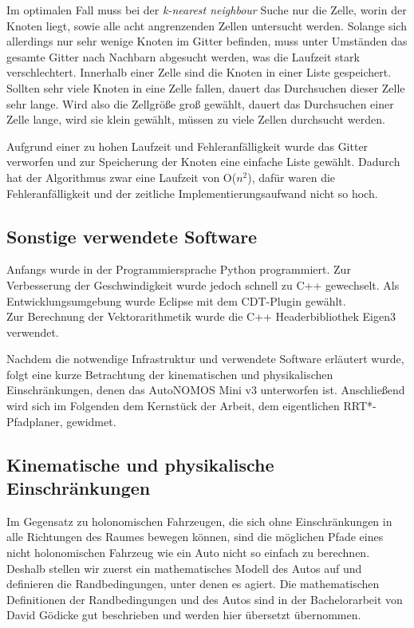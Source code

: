 Im optimalen Fall muss bei der \textit{k-nearest neighbour} Suche nur die Zelle, worin der Knoten liegt, sowie alle acht angrenzenden Zellen untersucht werden. Solange sich allerdings nur sehr wenige Knoten im Gitter befinden, muss unter Umständen das gesamte Gitter nach Nachbarn abgesucht werden, was die Laufzeit stark verschlechtert. Innerhalb einer Zelle sind die Knoten in einer Liste gespeichert. Sollten sehr viele Knoten in eine Zelle fallen, dauert das Durchsuchen dieser Zelle sehr lange. Wird also die Zellgröße groß gewählt, dauert das Durchsuchen einer Zelle lange, wird sie klein gewählt, müssen zu viele Zellen durchsucht werden. 

Aufgrund einer zu hohen Laufzeit und Fehleranfälligkeit wurde das Gitter verworfen und zur Speicherung der Knoten eine einfache Liste gewählt. Dadurch hat der Algorithmus zwar eine Laufzeit von O($n^2$), dafür waren die Fehleranfälligkeit und der zeitliche Implementierungsaufwand nicht so hoch. \\
\subsection{Sonstige verwendete Software}
Anfangs wurde in der Programmiersprache Python programmiert. Zur Verbesserung der Geschwindigkeit wurde jedoch schnell zu C++ gewechselt. Als Entwicklungsumgebung wurde Eclipse mit dem CDT-Plugin gewählt. \\
Zur Berechnung der Vektorarithmetik wurde die C++ Headerbibliothek Eigen3 verwendet.

Nachdem die notwendige Infrastruktur und verwendete Software erläutert wurde, folgt eine kurze Betrachtung der kinematischen und physikalischen Einschränkungen, denen das AutoNOMOS Mini v3 unterworfen ist. Anschließend wird sich im Folgenden dem Kernstück der Arbeit, dem eigentlichen RRT*-Pfadplaner, gewidmet.
\subsection{Kinematische und physikalische Einschränkungen}
Im Gegensatz zu holonomischen Fahrzeugen, die sich ohne Einschränkungen in alle Richtungen des Raumes bewegen können, sind die möglichen Pfade eines nicht holonomischen Fahrzeug wie ein Auto nicht so einfach zu berechnen. Deshalb stellen wir zuerst ein mathematisches Modell des Autos auf und definieren die Randbedingungen, unter denen es agiert.
Die mathematischen Definitionen der Randbedingungen und des Autos sind in der Bachelorarbeit von David Gödicke \citep{Goedicke18} gut beschrieben und werden hier übersetzt übernommen. \\

